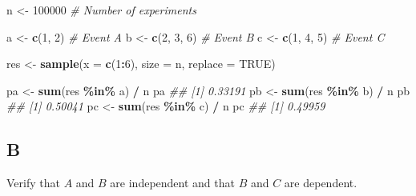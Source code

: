 \documentclass[
]{article}
\newenvironment{Shaded}{\begin{snugshade}}{\end{snugshade}}
\newcommand{\CommentTok}[1]{\textcolor[rgb]{0.56,0.35,0.01}{\textit{#1}}}
\newcommand{\DataTypeTok}[1]{\textcolor[rgb]{0.13,0.29,0.53}{#1}}
\newcommand{\DecValTok}[1]{\textcolor[rgb]{0.00,0.00,0.81}{#1}}
\newcommand{\KeywordTok}[1]{\textcolor[rgb]{0.13,0.29,0.53}{\textbf{#1}}}
\newcommand{\NormalTok}[1]{#1}
\newcommand{\OperatorTok}[1]{\textcolor[rgb]{0.81,0.36,0.00}{\textbf{#1}}}
\newcommand{\OtherTok}[1]{\textcolor[rgb]{0.56,0.35,0.01}{#1}}
\newcommand{\StringTok}[1]{\textcolor[rgb]{0.31,0.60,0.02}{#1}}
\begin{document}
\begin{Shaded}
\begin{Highlighting}[]
\NormalTok{n \textless{}{-}}\StringTok{ }\DecValTok{100000} \CommentTok{\# Number of experiments}

\NormalTok{a \textless{}{-}}\StringTok{ }\KeywordTok{c}\NormalTok{(}\DecValTok{1}\NormalTok{, }\DecValTok{2}\NormalTok{) }\CommentTok{\# Event A}
\NormalTok{b \textless{}{-}}\StringTok{ }\KeywordTok{c}\NormalTok{(}\DecValTok{2}\NormalTok{, }\DecValTok{3}\NormalTok{, }\DecValTok{6}\NormalTok{) }\CommentTok{\# Event B}
\NormalTok{c \textless{}{-}}\StringTok{ }\KeywordTok{c}\NormalTok{(}\DecValTok{1}\NormalTok{, }\DecValTok{4}\NormalTok{, }\DecValTok{5}\NormalTok{) }\CommentTok{\# Event C}

\NormalTok{res \textless{}{-}}\StringTok{ }\KeywordTok{sample}\NormalTok{(}\DataTypeTok{x =} \KeywordTok{c}\NormalTok{(}\DecValTok{1}\OperatorTok{:}\DecValTok{6}\NormalTok{), }\DataTypeTok{size =}\NormalTok{ n, }\DataTypeTok{replace =} \OtherTok{TRUE}\NormalTok{)}

\NormalTok{pa \textless{}{-}}\StringTok{ }\KeywordTok{sum}\NormalTok{(res }\OperatorTok{\%in\%}\StringTok{ }\NormalTok{a) }\OperatorTok{/}\StringTok{ }\NormalTok{n}
\NormalTok{pa}
\CommentTok{\#\# [1] 0.33191}
\NormalTok{pb \textless{}{-}}\StringTok{ }\KeywordTok{sum}\NormalTok{(res }\OperatorTok{\%in\%}\StringTok{ }\NormalTok{b) }\OperatorTok{/}\StringTok{ }\NormalTok{n}
\NormalTok{pb}
\CommentTok{\#\# [1] 0.50041}
\NormalTok{pc \textless{}{-}}\StringTok{ }\KeywordTok{sum}\NormalTok{(res }\OperatorTok{\%in\%}\StringTok{ }\NormalTok{c) }\OperatorTok{/}\StringTok{ }\NormalTok{n}
\NormalTok{pc}
\CommentTok{\#\# [1] 0.49959}
\end{Highlighting}
\end{Shaded}

\hypertarget{b-2}{%
\subsection{B}\label{b-2}}

Verify that \(A\) and \(B\) are independent and that \(B\) and \(C\) are
dependent.
\end{document}
